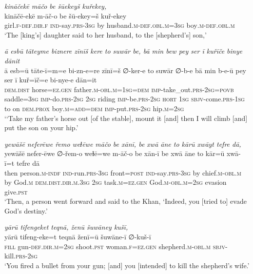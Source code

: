 \ea \label{KŠ.95}
\textit{kināčekē māčo be šūekeyš kuřekey,} \\ 
\gll kināčē-ekē m-āč-o be šū-ekey=š kuř-ekey \\ 
 girl\textsc{.f}\textsc{-def}\textsc{.dir}\textsc{.f} \textsc{ind-}say\textsc{.prs}\textsc{-3sg} by husband\textsc{.m}\textsc{-def}\textsc{.obl}\textsc{.m}\textsc{=3sg} boy\textsc{.m}\textsc{-def}\textsc{.obl}\textsc{.m} \\ 
\glt `The [king’s] daughter said to her husband, to the [shepherd’s] son,'
\z 
 
\ea \label{KŠ.96}
\textit{ā esbū tāteyme biznere zīnīš kere to suwār be, bā min bew pey ser ī kuřīče binye dānit} \\ 
\gll ā esb=ū tāte-ī=m=e bi-zn-e=re zīnī=š ∅-ker-e to suwār ∅-b-e bā min b-e-ū pey ser ī kuř=īč=e bi-nye-e dān=it \\ 
 \textsc{dem.dist} horse\textsc{\textsc{=ez.gen}} father\textsc{.m}\textsc{-obl}\textsc{.m}\textsc{=\textsc{1sg}}\textsc{=dem} \textsc{imp-}take\_out\textsc{.prs}-\textsc{2sg}\textsc{=\textsc{povb}} saddle\textsc{=3sg} \textsc{imp-}do\textsc{.prs}-\textsc{2sg} \textsc{2sg} riding \textsc{imp-}be\textsc{.prs}-\textsc{2sg} \textsc{hort} \textsc{1sg} \textsc{sbjv-}come\textsc{.prs}\textsc{-\textsc{1sg}} to on \textsc{dem.prox} boy\textsc{.m}\textsc{=add}\textsc{=dem} \textsc{imp-}put\textsc{.prs}-\textsc{2sg} hip\textsc{.m}\textsc{=\textsc{2sg}} \\ 
\glt `‘Take my father’s horse out [of the stable], mount it [and] then I will climb [and] put the son on your hip.'
\z 
 
\ea \label{KŠ.97}
\textit{yewāšē neferēwe řemo weɫēwe māčo be xānī, be xwā āne to kārū xwāyt tefre dā,} \\ 
\gll yewāšē nefer-ēwe ∅-řem-o weɫē=we m-āč-o be xān-ī be xwā āne to kār=ū xwā-ī=t tefre dā \\ 
 then person\textsc{.m}\textsc{-indf} \textsc{ind-}run\textsc{.prs}\textsc{-3sg} front\textsc{=\textsc{post}} \textsc{ind-}say\textsc{.prs}\textsc{-3sg} by chief\textsc{.m}\textsc{-obl}\textsc{.m} by God\textsc{.m} \textsc{dem.dist}\textsc{.dir}\textsc{.m}\textsc{.3sg} \textsc{2sg} task\textsc{.m}\textsc{\textsc{=ez.gen}} God\textsc{.m}\textsc{-obl}\textsc{.m}\textsc{=\textsc{2sg}} evasion give\textsc{.pst} \\ 
\glt `Then, a person went forward and said to the Khan, ‘Indeed, you [tried to] evade God’s destiny.'
\z 
 
\ea \label{KŠ.98}
\textit{yārū tifengeket teqnā, ženū šuwāney kušī,} \\ 
\gll yārū tifeng-eke=t teqnā ženī=ū šuwāne-ī ∅-kuš-ī \\ 
 \textsc{fill} gun\textsc{-def}\textsc{.dir}\textsc{.m}\textsc{=\textsc{2sg}} shoot\textsc{.pst} woman\textsc{.f}\textsc{\textsc{=ez.gen}} shepherd\textsc{.m}\textsc{-obl}\textsc{.m} \textsc{sbjv-}kill\textsc{.prs}-\textsc{2sg} \\ 
\glt `You fired a bullet from your gun; [and] you [intended] to kill the shepherd’s wife.'
\z 
 

